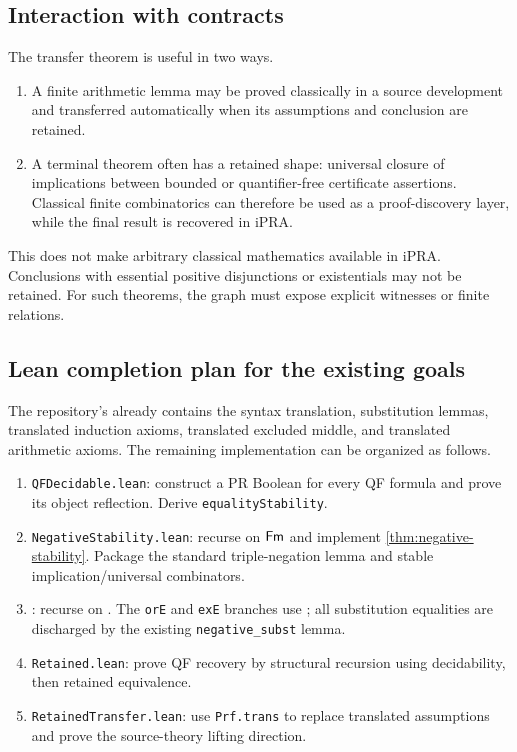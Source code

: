 \subsection{Interaction with \KIFC contracts}

The transfer theorem is useful in two ways.

\begin{enumerate}
\item A finite arithmetic lemma may be proved classically in a source development and transferred automatically when its assumptions and conclusion are retained.
\item A \KIFC terminal theorem often has a retained shape: universal closure of implications between bounded or quantifier-free certificate assertions.  Classical finite combinatorics can therefore be used as a proof-discovery layer, while the final result is recovered in iPRA.
\end{enumerate}

This does not make arbitrary classical mathematics available in iPRA.  Conclusions with essential positive disjunctions or existentials may not be retained.  For such theorems, the \KIFC graph must expose explicit witnesses or finite relations.

\subsection{Lean completion plan for the existing goals}

The repository's  already contains the syntax translation, substitution lemmas, translated induction axioms, translated excluded middle, and translated arithmetic axioms.  The remaining implementation can be organized as follows.

\begin{enumerate}
\item \texttt{QFDecidable.lean}: construct a PR Boolean for every QF formula and prove its object reflection.  Derive \texttt{equalityStability}.
\item \texttt{NegativeStability.lean}: recurse on \(\mathsf{Fm}\) and implement \cref{thm:negative-stability}.  Package the standard triple-negation lemma and stable implication/universal combinators.
\item {}: recurse on .  The \texttt{orE} and \texttt{exE} branches use ; all substitution equalities are discharged by the existing \texttt{negative\_subst} lemma.
\item \texttt{Retained.lean}: prove QF recovery by structural recursion using decidability, then retained equivalence.
\item \texttt{RetainedTransfer.lean}: use \texttt{Prf.trans} to replace translated assumptions and prove the source-theory lifting direction.
\end{enumerate}

